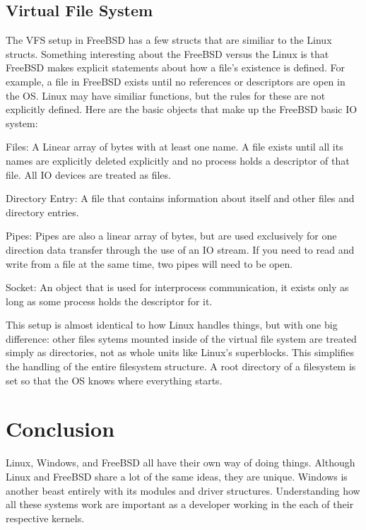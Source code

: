  \subsection{Virtual File System}
 The VFS setup in FreeBSD has a few structs that are similiar to the Linux structs.
 Something interesting about the FreeBSD versus the Linux is that FreeBSD
 makes explicit statements about how a file's existence is defined. For example,
 a file in FreeBSD exists until no references or descriptors are open in the OS.
 Linux may have similiar functions, but the rules for these are not explicitly
 defined. Here are the basic objects that make up the FreeBSD basic IO system:
 \cite{freebsd2016}
 \begin{description}
   \item Files: A Linear array of bytes with at least one name. A file exists
   until all its names are explicitly deleted explicitly and no process holds a
   descriptor of that file. All IO devices are treated as files.
   \item Directory Entry: A file that contains information about itself and
   other files and directory entries.
   \item Pipes: Pipes are also a linear array of bytes, but are used exclusively
   for one direction data transfer through the use of an IO stream. If you need
   to read and write from a file at the same time, two pipes will need to be open.
   \item Socket: An object that is used for interprocess communication, it exists
   only as long as some process holds the descriptor for it.
 \end{description}

 This setup is almost identical to how Linux handles things, but with one big
 difference: other files sytems mounted inside of the virtual file system are treated simply
 as directories, not as whole units like Linux's superblocks. This simplifies
 the handling of the entire filesystem structure. A root directory of a filesystem
 is set so that the OS knows where everything starts.

 \section{Conclusion}
Linux, Windows, and FreeBSD all have their own way of doing things. Although Linux
and FreeBSD share a lot of the same ideas, they are unique. Windows is another beast
entirely with its modules and driver structures. Understanding how all these systems
work are important as a developer working in the each of their respective kernels.

